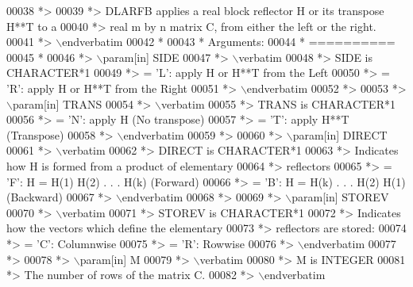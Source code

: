 \begin{DoxyCode}
00038 \textcolor{comment}{*>}
00039 \textcolor{comment}{*> DLARFB applies a real block reflector H or its transpose H**T to a}
00040 \textcolor{comment}{*> real m by n matrix C, from either the left or the right.}
00041 \textcolor{comment}{*> \(\backslash\)endverbatim}
00042 \textcolor{comment}{*}
00043 \textcolor{comment}{*  Arguments:}
00044 \textcolor{comment}{*  ==========}
00045 \textcolor{comment}{*}
00046 \textcolor{comment}{*> \(\backslash\)param[in] SIDE}
00047 \textcolor{comment}{*> \(\backslash\)verbatim}
00048 \textcolor{comment}{*>          SIDE is CHARACTER*1}
00049 \textcolor{comment}{*>          = 'L': apply H or H**T from the Left}
00050 \textcolor{comment}{*>          = 'R': apply H or H**T from the Right}
00051 \textcolor{comment}{*> \(\backslash\)endverbatim}
00052 \textcolor{comment}{*>}
00053 \textcolor{comment}{*> \(\backslash\)param[in] TRANS}
00054 \textcolor{comment}{*> \(\backslash\)verbatim}
00055 \textcolor{comment}{*>          TRANS is CHARACTER*1}
00056 \textcolor{comment}{*>          = 'N': apply H (No transpose)}
00057 \textcolor{comment}{*>          = 'T': apply H**T (Transpose)}
00058 \textcolor{comment}{*> \(\backslash\)endverbatim}
00059 \textcolor{comment}{*>}
00060 \textcolor{comment}{*> \(\backslash\)param[in] DIRECT}
00061 \textcolor{comment}{*> \(\backslash\)verbatim}
00062 \textcolor{comment}{*>          DIRECT is CHARACTER*1}
00063 \textcolor{comment}{*>          Indicates how H is formed from a product of elementary}
00064 \textcolor{comment}{*>          reflectors}
00065 \textcolor{comment}{*>          = 'F': H = H(1) H(2) . . . H(k) (Forward)}
00066 \textcolor{comment}{*>          = 'B': H = H(k) . . . H(2) H(1) (Backward)}
00067 \textcolor{comment}{*> \(\backslash\)endverbatim}
00068 \textcolor{comment}{*>}
00069 \textcolor{comment}{*> \(\backslash\)param[in] STOREV}
00070 \textcolor{comment}{*> \(\backslash\)verbatim}
00071 \textcolor{comment}{*>          STOREV is CHARACTER*1}
00072 \textcolor{comment}{*>          Indicates how the vectors which define the elementary}
00073 \textcolor{comment}{*>          reflectors are stored:}
00074 \textcolor{comment}{*>          = 'C': Columnwise}
00075 \textcolor{comment}{*>          = 'R': Rowwise}
00076 \textcolor{comment}{*> \(\backslash\)endverbatim}
00077 \textcolor{comment}{*>}
00078 \textcolor{comment}{*> \(\backslash\)param[in] M}
00079 \textcolor{comment}{*> \(\backslash\)verbatim}
00080 \textcolor{comment}{*>          M is INTEGER}
00081 \textcolor{comment}{*>          The number of rows of the matrix C.}
00082 \textcolor{comment}{*> \(\backslash\)endverbatim}

\end{DoxyCode}
